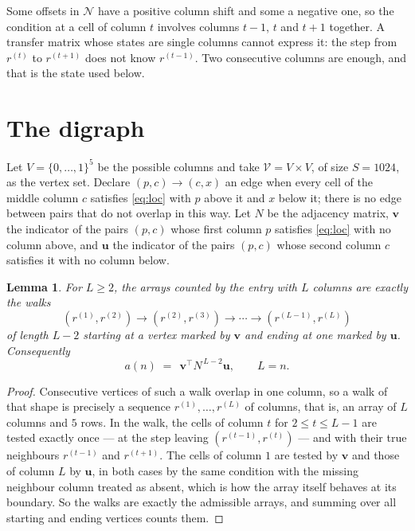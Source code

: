 \documentclass[11pt,a4paper]{article}
\theoremstyle{plain}
\newtheorem{lemma}[theorem]{Lemma}
\theoremstyle{definition}
\begin{document}
Some offsets in $\mathcal N$ have a positive column shift and some a negative one, so the
condition at a cell of column $t$ involves columns $t-1$, $t$ and $t+1$ together. A transfer
matrix whose states are single columns cannot express it: the step from $r^{(t)}$ to
$r^{(t+1)}$ does not know $r^{(t-1)}$. Two consecutive columns are enough, and that is
the state used below.

\section{The digraph}

Let $V=\{0,\dots,1\}^{5}$ be the possible columns and take
$\mathcal V=V\times V$, of size $S=1024$, as the vertex set. Declare $(p,c)\to(c,x)$ an edge
when every cell of the middle column $c$ satisfies \eqref{eq:loc} with $p$ above it and $x$
below it; there is no edge between pairs that do not overlap in this way. Let $N$ be the
adjacency matrix, $\mathbf{v}$ the indicator of the pairs $(p,c)$ whose first column $p$
satisfies \eqref{eq:loc} with no column above, and $\mathbf{u}$ the indicator of
the pairs $(p,c)$ whose second column $c$ satisfies it with no column below.

\begin{lemma}\label{lem:walk}
For $L\ge2$, the arrays counted by the entry with $L$ columns are exactly the walks
\[
(r^{(1)},r^{(2)})\to(r^{(2)},r^{(3)})\to\cdots\to(r^{(L-1)},r^{(L)})
\]
of length $L-2$ starting at a vertex marked by $\mathbf{v}$ and ending at one marked by
$\mathbf{u}$. Consequently
\[
a(n)\;=\;\,\mathbf{v}^{\!\top}N^{\,L-2}\mathbf{u},\qquad L=n .
\]
\end{lemma}

\begin{proof}
Consecutive vertices of such a walk overlap in one column, so a walk of that shape is
precisely a sequence $r^{(1)},\dots,r^{(L)}$ of columns, that is, an array of $L$ columns
and $5$ rows. In the walk, the cells of column $t$ for $2\le t\le L-1$ are tested
exactly once --- at the step leaving $(r^{(t-1)},r^{(t)})$ --- and with their true
neighbours $r^{(t-1)}$ and $r^{(t+1)}$. The cells of column $1$ are tested by
$\mathbf{v}$ and those of column $L$ by $\mathbf{u}$, in both cases by the same condition
with the missing neighbour column treated as absent, which is how the array itself behaves at
its boundary. So the walks are exactly the admissible arrays, and summing over all starting
and ending vertices counts them.
\end{proof}
\end{document}
